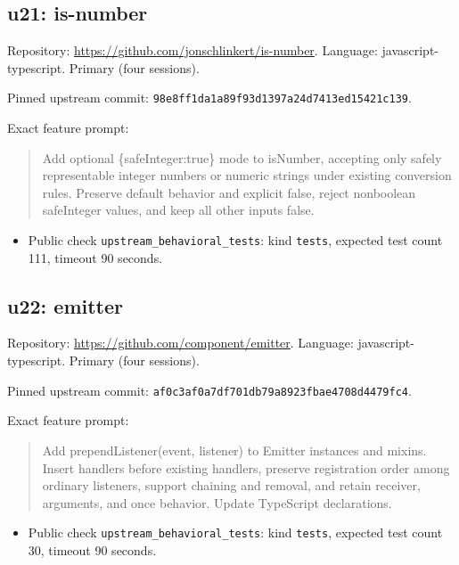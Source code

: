 \documentclass[manuscript,screen,nonacm]{acmart}
\providecommand{\tightlist}{\setlength{\itemsep}{0pt}\setlength{\parskip}{0pt}}
\begin{document}
\subsection{u21: is-number}\label{u21-is-number}

Repository: \url{https://github.com/jonschlinkert/is-number}. Language:
javascript-typescript. Primary (four sessions).

Pinned upstream commit:
\nolinkurl{98e8ff1da1a89f93d1397a24d7413ed15421c139}.

Exact feature prompt:

\begin{quote}
Add optional \{safeInteger:true\} mode to isNumber, accepting only
safely representable integer numbers or numeric strings under existing
conversion rules. Preserve default behavior and explicit false, reject
nonboolean safeInteger values, and keep all other inputs false.
\end{quote}

\begin{itemize}
\tightlist
\item
  Public check \nolinkurl{upstream_behavioral_tests}: kind
  \texttt{tests}, expected test count 111, timeout 90 seconds.
\end{itemize}

\subsection{u22: emitter}\label{u22-emitter}

Repository: \url{https://github.com/component/emitter}. Language:
javascript-typescript. Primary (four sessions).

Pinned upstream commit:
\nolinkurl{af0c3af0a7df701db79a8923fbae4708d4479fc4}.

Exact feature prompt:

\begin{quote}
Add prependListener(event, listener) to Emitter instances and mixins.
Insert handlers before existing handlers, preserve registration order
among ordinary listeners, support chaining and removal, and retain
receiver, arguments, and once behavior. Update TypeScript declarations.
\end{quote}

\begin{itemize}
\tightlist
\item
  Public check \nolinkurl{upstream_behavioral_tests}: kind
  \texttt{tests}, expected test count 30, timeout 90 seconds.
\end{itemize}
\end{document}
